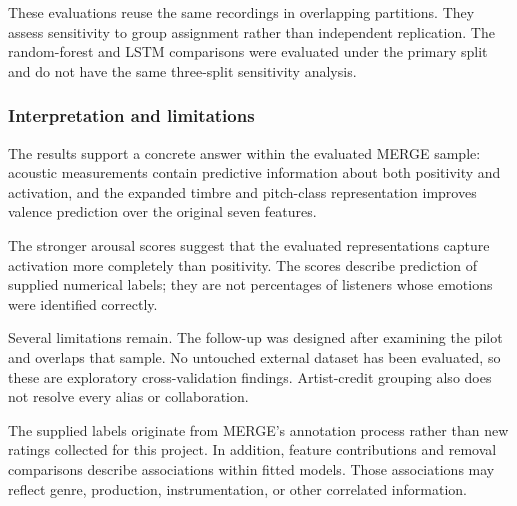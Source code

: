 These evaluations reuse the same recordings in overlapping partitions. They assess sensitivity to group assignment rather than independent replication. The random-forest and LSTM comparisons were evaluated under the primary split and do not have the same three-split sensitivity analysis.

\subsubsection{Interpretation and limitations}

The results support a concrete answer within the evaluated MERGE sample: acoustic measurements contain predictive information about both positivity and activation, and the expanded timbre and pitch-class representation improves valence prediction over the original seven features.

The stronger arousal scores suggest that the evaluated representations capture activation more completely than positivity. The scores describe prediction of supplied numerical labels; they are not percentages of listeners whose emotions were identified correctly.

Several limitations remain. The follow-up was designed after examining the pilot and overlaps that sample. No untouched external dataset has been evaluated, so these are exploratory cross-validation findings. Artist-credit grouping also does not resolve every alias or collaboration.

The supplied labels originate from MERGE's annotation process rather than new ratings collected for this project. In addition, feature contributions and removal comparisons describe associations within fitted models. Those associations may reflect genre, production, instrumentation, or other correlated information.

